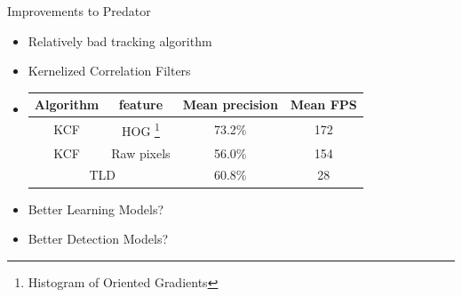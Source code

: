 \documentclass[mathserif]{beamer}
\begin{document}
\bgroup
\let\oldfootnoterule\footnoterule
\def\footnoterule{\only<4->\oldfootnoterule}
\begin{frame}{Improvements to Predator}
    \begin{itemize}
      \setlength\itemsep{.5em}
       \item \hspace{0pt}
          \pause Relatively bad tracking algorithm
       \item \hspace{0pt}
         \pause Kernelized Correlation Filters \cite{Enriques2014}
       \item \hspace{0pt}
          \pause
            \begin{tabular}[t]{cccc}
              \toprule
              Algorithm & feature & Mean precision & Mean FPS \\
              \midrule
              KCF       & HOG \footnote<4->{Histogram of Oriented Gradients}       & 73.2\%         & 172      \\
              \midrule
              KCF       & Raw pixels & 56.0\%      & 154      \\
              \midrule
              \multicolumn{2}{c}{TLD}   & 60.8\%      &  28      \\
              \bottomrule
            \end{tabular}
       \item \hspace{0pt}
         \pause Better Learning Models?
       \item \hspace{0pt}
         \pause Better Detection Models?
    \end{itemize}

\end{frame}
\egroup
\end{document}
